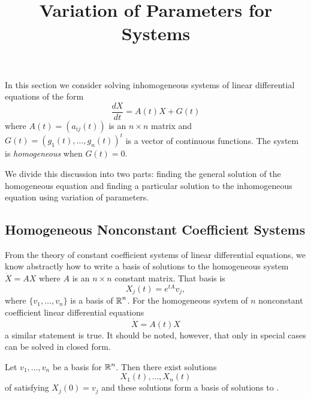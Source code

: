 \documentclass{ximera}
\title{Variation of Parameters for Systems}
\begin{document}
\begin{abstract}
\end{abstract}
\maketitle


\label{sec:LinInhomSys}

In this section we consider solving inhomogeneous systems of linear
differential equations  of the form
\arraystart
\begin{equation}  \label{eq:linihsys}
\frac{dX}{dt}  =  A(t)X + G(t) 
\end{equation}
\arrayfinish
where $A(t)=(a_{ij}(t))$ is an $n\times n$ matrix and
$G(t)=(g_1(t),\ldots,g_n(t))^t$ is a vector of continuous functions.  
The system is {\em homogeneous\/} when $G(t)=0$.

We divide this discussion into two parts: finding the 
general solution 
of the homogeneous equation and finding 
a particular 
solution to the 
inhomogeneous equation using variation of parameters.

\subsection*{Homogeneous Nonconstant Coefficient Systems}

From the theory of constant coefficient systems of linear differential 
equations, we know abstractly how to write  a  basis of solutions to
the homogeneous system  $\dot{X}=AX$ where $A$ is an $n\times n$
constant matrix.  That basis is 
\[
X_j(t) = e^{tA}v_j,
\]
where $\{v_1,\ldots,v_n\}$ is a basis of $\mbox{$\Bbb{R}$}^n$.  For the 
homogeneous 
system of $n$ nonconstant coefficient linear differential equations
\begin{equation}  \label{E:NCCH}
\dot{X} = A(t) X
\end{equation}
a similar statement is true.   It should be noted, however, that only in 
special cases can  be solved in closed form.

\begin{prop}  \label{P:NCCH}
Let $v_1,\ldots,v_n$ be a basis 
for $\mbox{$\Bbb{R}$}^n$.  Then there exist solutions 
\[
X_1(t),\ldots,X_n(t)
\]
of  satisfying $X_j(0)=v_j$ and these
solutions form a basis of solutions 
to .
\end{prop}
\end{document}
